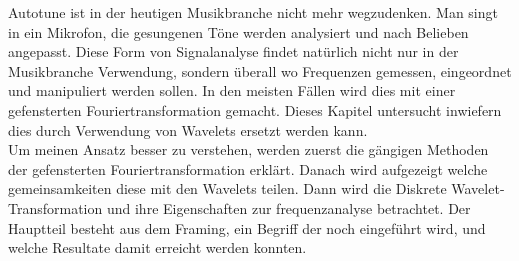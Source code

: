 Autotune ist in der heutigen Musikbranche nicht mehr wegzudenken. Man singt in ein Mikrofon, die gesungenen Töne werden analysiert und nach Belieben angepasst. Diese Form von Signalanalyse findet natürlich nicht nur in der Musikbranche Verwendung, sondern überall wo Frequenzen gemessen, eingeordnet und manipuliert werden sollen. In den meisten Fällen wird dies mit einer gefensterten Fouriertransformation gemacht. Dieses Kapitel untersucht inwiefern dies durch Verwendung von Wavelets ersetzt werden kann.\\

Um meinen Ansatz besser zu verstehen, werden zuerst die gängigen Methoden der gefensterten Fouriertransformation erklärt. Danach wird aufgezeigt welche gemeinsamkeiten diese mit den Wavelets teilen. Dann wird die Diskrete Wavelet-Transformation und ihre Eigenschaften zur frequenzanalyse betrachtet. Der Hauptteil besteht aus dem Framing, ein Begriff der noch eingeführt wird, und welche Resultate damit erreicht werden konnten. 